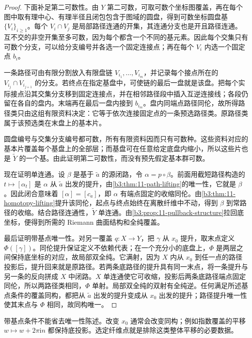 \begin{proof}
下面补足第二可数性。由 \(Y\) 第二可数，可取可数个坐标图覆盖，再在每个图中取有理中心、有理半径且闭包包含于图域的圆盘，得到可数坐标圆盘基 \(\{V_i\}_{i\ge1}\)。每个 \(V_i\cap V_j\) 是局部路径连通的开集，其连通分支也是开且路径连通。互不交的非空开集至多可数，因为每个都含一个不同的基元素。因此每个交集只有可数个分支，可以给分支编号并各选一个固定连接点；再在每个 \(V_i\) 内选一个固定点 \(b_i\)。

一条路径可由有限分割放入有限盘链 \(V_{i_1},\ldots,V_{i_m}\)，并记录每个接点所在的 \(V_{i_j}\cap V_{i_{j+1}}\) 的分支。若终点在指定基盘中，可使链的最后一盘就是该盘。把每个实际接点沿其交集分支移到固定连接点，并在相邻路径段中插入互逆连接线；各段仍留在各自的盘内。末端再在最后一盘内接到 \(b_{i_m}\)。盘内同端点路径同伦，故所得路径类只由这组有限资料决定：它等于依次连接固定点的一条预选路径类。原路径类属于该预选类在末盘上的基本片。

圆盘编号与交集分支编号都可数，所有有限资料因而只有可数种。这些资料对应的基本片覆盖每个基盘上的全部层；而基盘可在任意给定底盘内缩小，所以这些片也是 \(\widetilde Y\) 的一个基。由此证明第二可数性，而没有预先假定基本群可数。

现在证明单连通。设 \(\beta\) 是基于 \(\widetilde a\) 的源闭路，令 \(\alpha=p\circ\beta\)。前面用截短路径构造的 \(t\mapsto[\alpha_t]\) 是 \(\alpha\) 从 \(\widetilde a\) 出发的提升，由\cref{b3:thm:11-path-lifting}的唯一性，它就是 \(\beta\)。因此闭合意味着 \([\alpha]=[c_a]\)，即 \(\alpha\) 有端点固定的收缩同伦。由\cref{b3:thm:11-homotopy-lifting}提升该同伦，起点与终点始终在离散纤维中不动，得到 \(\beta\) 到常路径的收缩。结合路径连通性，\(\widetilde Y\) 单连通。由\cref{b3:prop:11-pullback-structure}拉回底坐标，便得到所需的 Riemann 曲面结构和全纯覆盖。

最后证明带基点唯一性。对另一覆盖 \(q:X\rightarrow Y\)，把 \(\gamma\) 从 \(x_0\) 提升，取末点定义 \(\Phi([\gamma])\)。同伦提升保证定义不依赖代表；在一个充分小的底盘上，\(\Phi\) 是两层之间保持底坐标的对应，故局部双全纯。它满射，因为 \(X\) 内从 \(x_0\) 到任一点的路径投影后，提升回来就是原路径。若两条底路径的提升具有同一末点，将一条提升与另一条的反向拼成 \(X\) 中闭路。\(X\) 单连通使它可收缩，投影后两条底路径端点固定同伦，所以两路径类相同，\(\Phi\) 单射。局部双全纯的双射有全纯逆。任何满足所述基点条件的覆盖同构，都把从 \(\widetilde a\) 出发的提升变成从 \(x_0\) 出发的提升；路径提升唯一性使其末点与 \(\Phi\) 相同，故同构唯一。
\end{proof}

带基点条件不能省去唯一性陈述。改变 \(x_0\) 通常会改变同构；例如指数覆盖的平移 \(w\mapsto w+2\pi\mathrm i n\) 都保持底投影。选定纤维点就是排除这类整体平移的必要数据。

